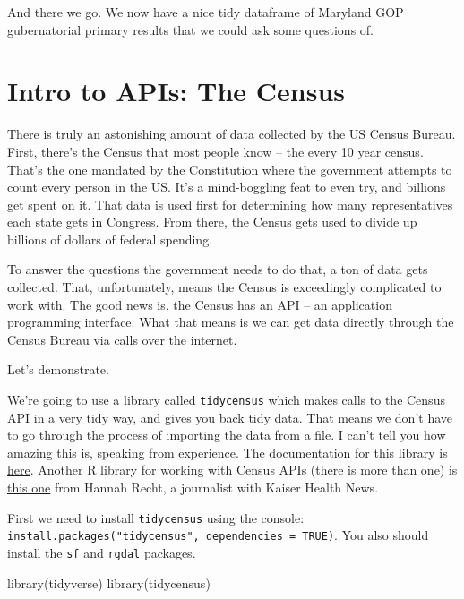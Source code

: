 \documentclass[
  letterpaper,
  DIV=11,
  numbers=noendperiod]{scrreprt}
\newenvironment{Shaded}{\begin{snugshade}}{\end{snugshade}}
\newcommand{\FunctionTok}[1]{\textcolor[rgb]{0.28,0.35,0.67}{#1}}
\newcommand{\NormalTok}[1]{\textcolor[rgb]{0.00,0.23,0.31}{#1}}
\begin{document}
And there we go. We now have a nice tidy dataframe of Maryland GOP
gubernatorial primary results that we could ask some questions of.


\hypertarget{intro-to-apis-the-census}{%
\chapter{Intro to APIs: The Census}\label{intro-to-apis-the-census}}

There is truly an astonishing amount of data collected by the US Census
Bureau. First, there's the Census that most people know -- the every 10
year census. That's the one mandated by the Constitution where the
government attempts to count every person in the US. It's a
mind-boggling feat to even try, and billions get spent on it. That data
is used first for determining how many representatives each state gets
in Congress. From there, the Census gets used to divide up billions of
dollars of federal spending.

To answer the questions the government needs to do that, a ton of data
gets collected. That, unfortunately, means the Census is exceedingly
complicated to work with. The good news is, the Census has an API -- an
application programming interface. What that means is we can get data
directly through the Census Bureau via calls over the internet.

Let's demonstrate.

We're going to use a library called \texttt{tidycensus} which makes
calls to the Census API in a very tidy way, and gives you back tidy
data. That means we don't have to go through the process of importing
the data from a file. I can't tell you how amazing this is, speaking
from experience. The documentation for this library is
\href{https://walker-data.com/tidycensus/}{here}. Another R library for
working with Census APIs (there is more than one) is
\href{https://github.com/hrecht/censusapi}{this one} from Hannah Recht,
a journalist with Kaiser Health News.

First we need to install \texttt{tidycensus} using the console:
\texttt{install.packages("tidycensus",\ dependencies\ =\ TRUE)}. You
also should install the \texttt{sf} and \texttt{rgdal} packages.

\begin{Shaded}
\begin{Highlighting}[]
\FunctionTok{library}\NormalTok{(tidyverse)}
\FunctionTok{library}\NormalTok{(tidycensus)}
\end{Highlighting}
\end{Shaded}
\end{document}
